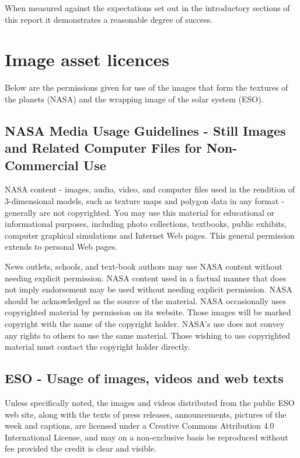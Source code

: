 \documentclass[twoside]{bhamthesis}
\begin{document}
When measured against the expectations set out in the introductory sections of this report it demonstrates a reasonable degree of success.



\printbibliography

\appendix
\appendixpage
\addappheadtotoc

\section{Image asset licences}

Below are the permissions given for use of the images that form the textures of the planets (NASA) and the wrapping image of the solar system (ESO).

\subsection{NASA Media Usage Guidelines - Still Images and Related Computer Files for Non-Commercial Use}

NASA content - images, audio, video, and computer files used in the rendition of 3-dimensional models, such as texture maps and polygon data in any format - generally are not copyrighted. You may use this material for educational or informational purposes, including photo collections, textbooks, public exhibits, computer graphical simulations and Internet Web pages. This general permission extends to personal Web pages.

News outlets, schools, and text-book authors may use NASA content without needing explicit permission. NASA content used in a factual manner that does not imply endorsement may be used without needing explicit permission. NASA should be acknowledged as the source of the material. NASA occasionally uses copyrighted material by permission on its website. Those images will be marked copyright with the name of the copyright holder. NASA's use does not convey any rights to others to use the same material. Those wishing to use copyrighted material must contact the copyright holder directly.

\subsection{ESO - Usage of images, videos and web texts}

Unless specifically noted, the images and videos distributed from the public ESO web site, along with the texts of press releases, announcements, pictures of the week and captions, are licensed under a Creative Commons Attribution 4.0 International License, and may on a non-exclusive basis be reproduced without fee provided the credit is clear and visible.
\end{document}
